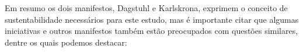 Em resumo os dois manifestos, Dagstuhl e Karlskrona, exprimem o conceito de
sustentabilidade necessários para este estudo, mas é importante citar que
algumas iniciativas e outros manifestos também estão preocupados com questões
similares, dentre os quais podemos destacar:

%
%

